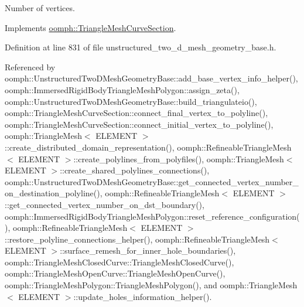 Number of vertices. 



Implements \hyperlink{classoomph_1_1TriangleMeshCurveSection_a491d849e8147152c10d55c8ca6c3d63d}{oomph\+::\+Triangle\+Mesh\+Curve\+Section}.



Definition at line 831 of file unstructured\+\_\+two\+\_\+d\+\_\+mesh\+\_\+geometry\+\_\+base.\+h.



Referenced by oomph\+::\+Unstructured\+Two\+D\+Mesh\+Geometry\+Base\+::add\+\_\+base\+\_\+vertex\+\_\+info\+\_\+helper(), oomph\+::\+Immersed\+Rigid\+Body\+Triangle\+Mesh\+Polygon\+::assign\+\_\+zeta(), oomph\+::\+Unstructured\+Two\+D\+Mesh\+Geometry\+Base\+::build\+\_\+triangulateio(), oomph\+::\+Triangle\+Mesh\+Curve\+Section\+::connect\+\_\+final\+\_\+vertex\+\_\+to\+\_\+polyline(), oomph\+::\+Triangle\+Mesh\+Curve\+Section\+::connect\+\_\+initial\+\_\+vertex\+\_\+to\+\_\+polyline(), oomph\+::\+Triangle\+Mesh$<$ E\+L\+E\+M\+E\+N\+T $>$\+::create\+\_\+distributed\+\_\+domain\+\_\+representation(), oomph\+::\+Refineable\+Triangle\+Mesh$<$ E\+L\+E\+M\+E\+N\+T $>$\+::create\+\_\+polylines\+\_\+from\+\_\+polyfiles(), oomph\+::\+Triangle\+Mesh$<$ E\+L\+E\+M\+E\+N\+T $>$\+::create\+\_\+shared\+\_\+polylines\+\_\+connections(), oomph\+::\+Unstructured\+Two\+D\+Mesh\+Geometry\+Base\+::get\+\_\+connected\+\_\+vertex\+\_\+number\+\_\+on\+\_\+destination\+\_\+polyline(), oomph\+::\+Refineable\+Triangle\+Mesh$<$ E\+L\+E\+M\+E\+N\+T $>$\+::get\+\_\+connected\+\_\+vertex\+\_\+number\+\_\+on\+\_\+dst\+\_\+boundary(), oomph\+::\+Immersed\+Rigid\+Body\+Triangle\+Mesh\+Polygon\+::reset\+\_\+reference\+\_\+configuration(), oomph\+::\+Refineable\+Triangle\+Mesh$<$ E\+L\+E\+M\+E\+N\+T $>$\+::restore\+\_\+polyline\+\_\+connections\+\_\+helper(), oomph\+::\+Refineable\+Triangle\+Mesh$<$ E\+L\+E\+M\+E\+N\+T $>$\+::surface\+\_\+remesh\+\_\+for\+\_\+inner\+\_\+hole\+\_\+boundaries(), oomph\+::\+Triangle\+Mesh\+Closed\+Curve\+::\+Triangle\+Mesh\+Closed\+Curve(), oomph\+::\+Triangle\+Mesh\+Open\+Curve\+::\+Triangle\+Mesh\+Open\+Curve(), oomph\+::\+Triangle\+Mesh\+Polygon\+::\+Triangle\+Mesh\+Polygon(), and oomph\+::\+Triangle\+Mesh$<$ E\+L\+E\+M\+E\+N\+T $>$\+::update\+\_\+holes\+\_\+information\+\_\+helper().

\mbox{\label{classoomph_1_1TriangleMeshPolyLine_a8306f0768e83e29aac7d0d2f9fb3c175}} 
